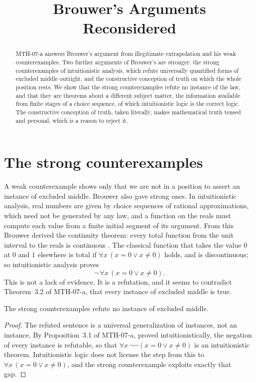 \documentclass{situationist-preprint}
\title{Brouwer's Arguments Reconsidered}
\begin{document}
\maketitle

\begin{abstract}
MTH-07-a answers Brouwer's argument from illegitimate extrapolation and his weak counterexamples. Two further arguments of Brouwer's are stronger: the strong counterexamples of intuitionistic analysis, which refute universally quantified forms of excluded middle outright, and the constructive conception of truth on which the whole position rests. We show that the strong counterexamples refute no instance of the law, and that they are theorems about a different subject matter, the information available from finite stages of a choice sequence, of which intuitionistic logic is the correct logic. The constructive conception of truth, taken literally, makes mathematical truth tensed and personal, which is a reason to reject it.
\end{abstract}

\section{The strong counterexamples}\label{s:strong}

A weak counterexample shows only that we are not in a position to assert an instance of excluded middle. Brouwer also gave strong ones. In intuitionistic analysis, real numbers are given by choice sequences of rational approximations, which need not be generated by any law, and a function on the reals must compute each value from a finite initial segment of its argument. From this Brouwer derived the continuity theorem: every total function from the unit interval to the reals is continuous \citep{Heyting1956}. The classical function that takes the value $0$ at $0$ and $1$ elsewhere is total if $\forall x\,(x = 0 \vee x \neq 0)$ holds, and is discontinuous; so intuitionistic analysis proves
\[ \neg\, \forall x\, (x = 0 \vee x \neq 0). \]
This is not a lack of evidence. It is a refutation, and it seems to contradict Theorem~3.2 of MTH-07-a, that every instance of excluded middle is true.

\begin{proposition}\label{p:noinst}
The strong counterexamples refute no instance of excluded middle.
\end{proposition}

\begin{proof}
The refuted sentence is a universal generalization of instances, not an instance. By Proposition~3.1 of MTH-07-a, proved intuitionistically, the negation of every instance is refutable, so that $\forall x\, \neg\neg(x = 0 \vee x \neq 0)$ is an intuitionistic theorem. Intuitionistic logic does not license the step from this to $\forall x\,(x = 0 \vee x \neq 0)$, and the strong counterexample exploits exactly that gap.
\end{proof}
\end{document}

